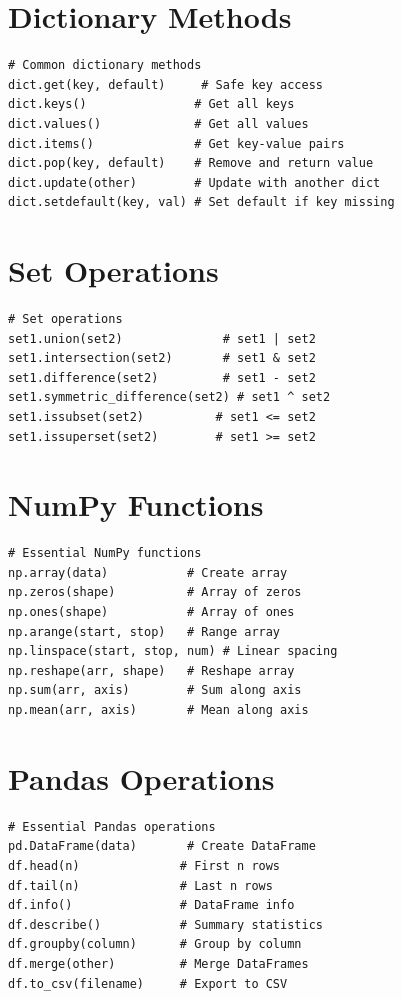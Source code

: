 \documentclass[12pt,a4paper]{book}
\begin{document}
\section{Dictionary Methods}
\begin{lstlisting}
# Common dictionary methods
dict.get(key, default)     # Safe key access
dict.keys()               # Get all keys
dict.values()             # Get all values
dict.items()              # Get key-value pairs
dict.pop(key, default)    # Remove and return value
dict.update(other)        # Update with another dict
dict.setdefault(key, val) # Set default if key missing
\end{lstlisting}

\section{Set Operations}
\begin{lstlisting}
# Set operations
set1.union(set2)              # set1 | set2
set1.intersection(set2)       # set1 & set2
set1.difference(set2)         # set1 - set2
set1.symmetric_difference(set2) # set1 ^ set2
set1.issubset(set2)          # set1 <= set2
set1.issuperset(set2)        # set1 >= set2
\end{lstlisting}

\section{NumPy Functions}
\begin{lstlisting}
# Essential NumPy functions
np.array(data)           # Create array
np.zeros(shape)          # Array of zeros
np.ones(shape)           # Array of ones
np.arange(start, stop)   # Range array
np.linspace(start, stop, num) # Linear spacing
np.reshape(arr, shape)   # Reshape array
np.sum(arr, axis)        # Sum along axis
np.mean(arr, axis)       # Mean along axis
\end{lstlisting}

\section{Pandas Operations}
\begin{lstlisting}
# Essential Pandas operations
pd.DataFrame(data)       # Create DataFrame
df.head(n)              # First n rows
df.tail(n)              # Last n rows
df.info()               # DataFrame info
df.describe()           # Summary statistics
df.groupby(column)      # Group by column
df.merge(other)         # Merge DataFrames
df.to_csv(filename)     # Export to CSV
\end{lstlisting}
\end{document}
